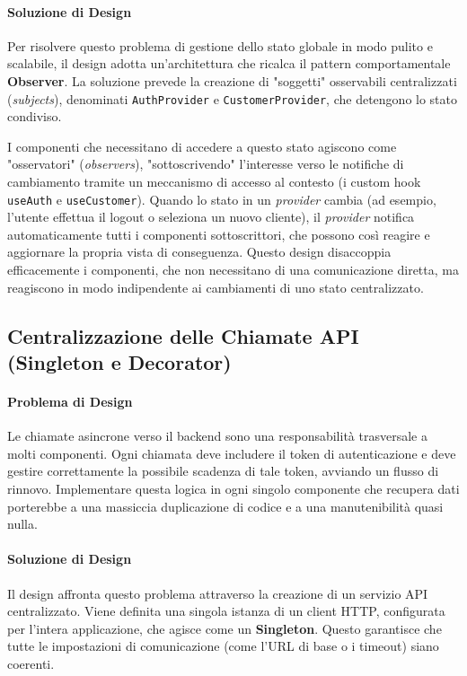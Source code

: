 \documentclass[12pt,a4paper,openright,twoside]{book}
\begin{document}
\paragraph{Soluzione di Design}
Per risolvere questo problema di gestione dello stato globale in modo pulito e scalabile, il design adotta un'architettura che ricalca il pattern comportamentale \textbf{Observer}. La soluzione prevede la creazione di "soggetti" osservabili centralizzati (\textit{subjects}), denominati \texttt{AuthProvider} e \texttt{CustomerProvider}, che detengono lo stato condiviso.

I componenti che necessitano di accedere a questo stato agiscono come "osservatori" (\textit{observers}), "sottoscrivendo" l'interesse verso le notifiche di cambiamento tramite un meccanismo di accesso al contesto (i custom hook \texttt{useAuth} e \texttt{useCustomer}). Quando lo stato in un \textit{provider} cambia (ad esempio, l'utente effettua il logout o seleziona un nuovo cliente), il \textit{provider} notifica automaticamente tutti i componenti sottoscrittori, che possono così reagire e aggiornare la propria vista di conseguenza. Questo design disaccoppia efficacemente i componenti, che non necessitano di una comunicazione diretta, ma reagiscono in modo indipendente ai cambiamenti di uno stato centralizzato.

\subsection{Centralizzazione delle Chiamate API (Singleton e Decorator)}
\label{subsec:design_api_singleton_decorator}

\paragraph{Problema di Design}
Le chiamate asincrone verso il backend sono una responsabilità trasversale a molti componenti. Ogni chiamata deve includere il token di autenticazione e deve gestire correttamente la possibile scadenza di tale token, avviando un flusso di rinnovo. Implementare questa logica in ogni singolo componente che recupera dati porterebbe a una massiccia duplicazione di codice e a una manutenibilità quasi nulla.

\paragraph{Soluzione di Design}
Il design affronta questo problema attraverso la creazione di un servizio API centralizzato. Viene definita una singola istanza di un client HTTP, configurata per l'intera applicazione, che agisce come un \textbf{Singleton}. Questo garantisce che tutte le impostazioni di comunicazione (come l'URL di base o i timeout) siano coerenti.
\end{document}
